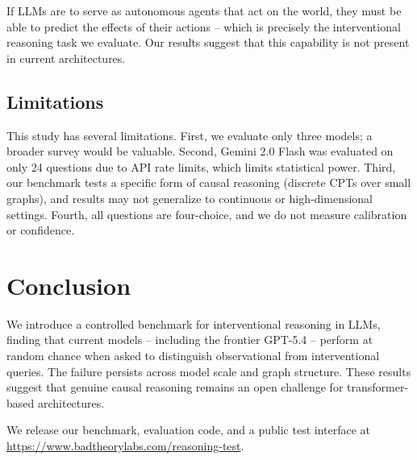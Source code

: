 \documentclass[11pt,a4paper]{article}
\begin{document}
If LLMs are to serve as autonomous agents that act on the world, they must be able to predict the effects of their actions -- which is precisely the interventional reasoning task we evaluate. Our results suggest that this capability is not present in current architectures.

\subsection{Limitations}

This study has several limitations. First, we evaluate only three models; a broader survey would be valuable. Second, Gemini 2.0 Flash was evaluated on only 24 questions due to API rate limits, which limits statistical power. Third, our benchmark tests a specific form of causal reasoning (discrete CPTs over small graphs), and results may not generalize to continuous or high-dimensional settings. Fourth, all questions are four-choice, and we do not measure calibration or confidence.

\section{Conclusion}

We introduce a controlled benchmark for interventional reasoning in LLMs, finding that current models -- including the frontier GPT-5.4 -- perform at random chance when asked to distinguish observational from interventional queries. The failure persists across model scale and graph structure. These results suggest that genuine causal reasoning remains an open challenge for transformer-based architectures.

We release our benchmark, evaluation code, and a public test interface at \url{https://www.badtheorylabs.com/reasoning-test}.
\end{document}

